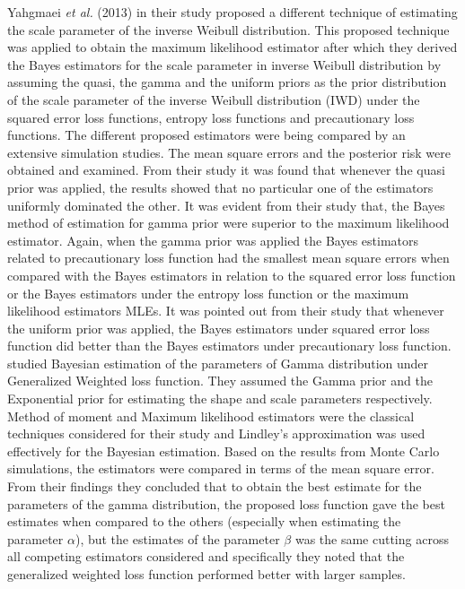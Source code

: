 \documentclass[a4paper,12pt]{report}
\newcommand{\para}{\hspace{0.5cm}}
\begin{document}
\noindent\para Yahgmaei \textit{et al.} (2013) in their study proposed a different technique of estimating the scale parameter of the inverse Weibull distribution. This proposed technique was applied to obtain the maximum likelihood estimator after which they derived the Bayes estimators for the scale parameter in inverse Weibull distribution by assuming the quasi, the gamma and the uniform priors as the prior distribution of the scale parameter of the inverse Weibull distribution (IWD) under the squared error loss functions, entropy loss functions and precautionary loss functions. The different proposed estimators were being compared by an extensive simulation studies. The mean square errors and the posterior risk were obtained and examined.  From their study it was found that whenever the quasi prior was applied, the results showed that no particular one of the estimators uniformly dominated the other. It was evident from their study that, the Bayes method of estimation for gamma prior were superior to the maximum likelihood estimator. Again, when the gamma prior was applied the Bayes estimators related to precautionary loss function had the smallest mean square errors when compared with the Bayes estimators in relation to the squared error loss function or the Bayes estimators under the entropy loss function or the maximum likelihood estimators MLEs. It was pointed out from their study that whenever the uniform prior was applied, the Bayes estimators under squared error loss function did better than the Bayes estimators under precautionary loss function.\\

\noindent\para \cite{naji2019bayesian} studied Bayesian estimation of the parameters of Gamma distribution under Generalized Weighted loss function. They assumed the Gamma prior and the Exponential prior for estimating the shape and scale parameters respectively. Method of moment and Maximum likelihood estimators were the classical techniques considered for their study and Lindley’s approximation was used effectively for the Bayesian estimation. Based on the results from Monte Carlo simulations, the estimators were compared in terms of the mean square error. From their findings they concluded that to obtain the best estimate for the parameters of the gamma distribution, the proposed loss function gave the best estimates when compared to the others (especially when estimating the parameter $\alpha$), but the estimates of the parameter $\beta$ was the same cutting across all competing estimators considered and specifically they noted that the generalized weighted loss function performed better with larger samples.\\
\end{document}
